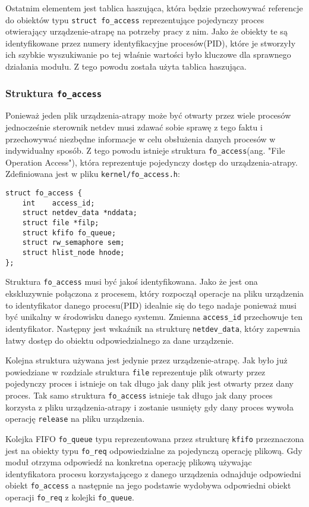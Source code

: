 \documentclass[10pt]{article}
\begin{document}
Ostatnim elementem jest tablica haszująca, która będzie przechowywać referencje do obiektów typu \texttt{struct fo\_access} reprezentujące pojedynczy proces otwierający urządzenie-atrapę na potrzeby pracy z nim.  Jako że obiekty te są identyfikowane przez numery identyfikacyjne procesów(PID), które je stworzyły ich szybkie wyszukiwanie po tej właśnie wartości było kluczowe dla sprawnego działania modułu. Z tego powodu została użyta tablica haszująca.

\subsubsection{Struktura \texttt{\large{fo\_access}}}

Ponieważ jeden plik urządzenia-atrapy może być otwarty przez wiele procesów jednocześnie sterownik netdev musi zdawać sobie sprawę z tego faktu i przechowywać niezbędne informacje w celu obsłużenia danych procesów w indywidualny sposób. Z tego powodu istnieje struktura \texttt{fo\_access}(ang. "File Operation Access"), która reprezentuje pojedynczy dostęp do urządzenia-atrapy. Zdefiniowana jest w pliku \texttt{kernel/fo\_access.h}:

\begin{verbatim}
struct fo_access {
    int    access_id;
    struct netdev_data *nddata;
    struct file *filp;
    struct kfifo fo_queue;
    struct rw_semaphore sem;
    struct hlist_node hnode;
};
\end{verbatim}

Struktura \texttt{fo\_access} musi być jakoś identyfikowana. Jako że jest ona ekskluzywnie połączona z procesem, który rozpoczął operacje na pliku urządzenia to identyfikator danego procesu(PID) idealnie się do tego nadaje ponieważ musi być unikalny w środowisku danego systemu.  Zmienna \texttt{access\_id} przechowuje ten identyfikator. Następny jest wskaźnik na strukturę \texttt{netdev\_data}, który zapewnia łatwy dostęp do obiektu odpowiedzialnego za dane urządzenie.

Kolejna struktura używana jest jedynie przez urządzenie-atrapę. Jak było już powiedziane w rozdziale  struktura \texttt{file} reprezentuje plik otwarty przez pojedynczy proces i istnieje on tak długo jak dany plik jest otwarty przez dany proces. Tak samo struktura \texttt{fo\_access} istnieje tak długo jak dany proces korzysta z pliku urządzenia-atrapy i zostanie usunięty gdy dany proces wywoła operację \texttt{release} na pliku urządzenia.

Kolejka FIFO \texttt{fo\_queue} typu reprezentowana przez strukturę \texttt{kfifo} przeznaczona jest na obiekty typu \texttt{fo\_req} odpowiedzialne za pojedynczą operację plikową. Gdy moduł otrzyma odpowiedź na konkretna operację plikową używając identyfikatora procesu korzystającego z danego urządzenia odnajduje odpowiedni obiekt \texttt{fo\_access} a następnie na jego podstawie wydobywa odpowiedni obiekt operacji \texttt{fo\_req} z kolejki \texttt{fo\_queue}.
\end{document}
